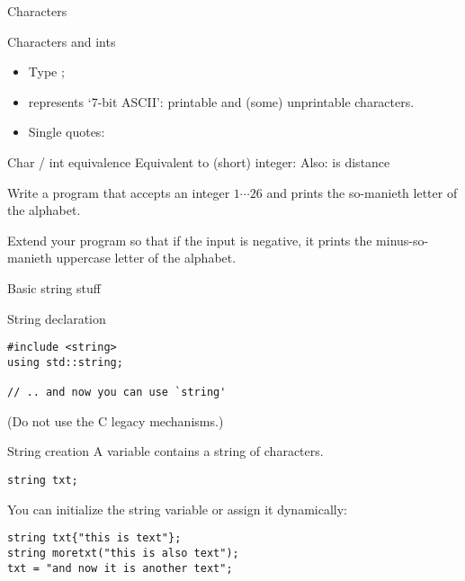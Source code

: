 
 {Characters}

\begin{block}{Characters and ints}
  \label{sl:chardef}
  \begin{itemize}
  \item Type ;
  \item represents `7-bit ASCII': printable and (some) unprintable
    characters.
  \item Single quotes: 
  \end{itemize}
\end{block}

\begin{block}{Char / int equivalence}
  \label{sl:int-char}
  Equivalent to (short) integer:
  Also:  is distance 
\end{block}

\begin{exercise}
  \label{ex:print-ichar}
  Write a program that accepts an integer $1\cdots26$ and prints the
  so-manieth letter of the alphabet.

  Extend your program so that if the input is negative, it prints the
  minus-so-manieth uppercase letter of the alphabet.
\end{exercise}

 {Basic string stuff}
\label{sec:string}

\begin{block}{String declaration}
  \label{sl:string-declare}
\begin{lstlisting}
#include <string>
using std::string;

// .. and now you can use `string'
\end{lstlisting}
(Do not use the C legacy mechanisms.)
\end{block}

\begin{block}{String creation}
  \label{sl:string-create}
  A  variable contains a string of characters.
\begin{lstlisting}
string txt;
\end{lstlisting}
You can initialize the string variable or assign it dynamically:
\begin{lstlisting}
string txt{"this is text"};
string moretxt("this is also text");
txt = "and now it is another text";
\end{lstlisting}
\end{block}

